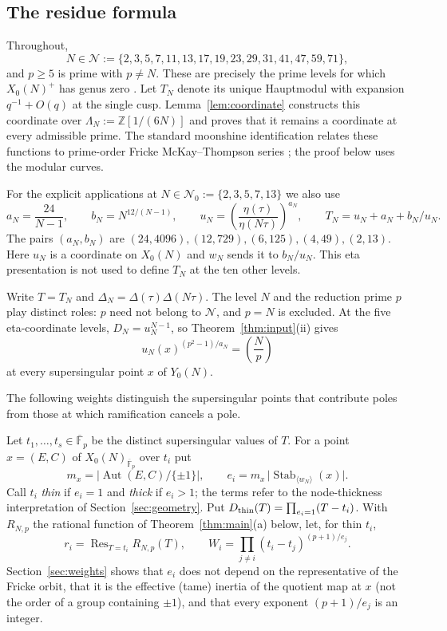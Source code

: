 \documentclass[11pt,a4paper]{article}
\numberwithin{equation}{section}
\theoremstyle{definition}
\theoremstyle{remark}
\newcommand{\Fb}{\overline{\mathbb F}_p}
\newcommand{\Z}{\mathbb Z}
\newcommand{\Res}{\operatorname{Res}}
\newcommand{\Aut}{\operatorname{Aut}}
\newcommand{\Stab}{\operatorname{Stab}}
\newcommand{\Lp}[1]{\left(\frac{#1}{p}\right)}
\begin{document}
\subsection{The residue formula}
Throughout,
\[
N\in\mathcal N:=\{2,3,5,7,11,13,17,19,23,29,31,41,47,59,71\},
\]
and $p\ge5$ is prime with $p\ne N$.
These are precisely the prime levels for which $X_0(N)^+$ has genus
zero \citep[\S3, Corollary]{Ogg75}. Let $T_N$ denote its unique
Hauptmodul with expansion $q^{-1}+O(q)$ at the single cusp.
Lemma~\ref{lem:coordinate} constructs this coordinate over
$\Lambda_N:=\Z[1/(6N)]$ and proves that it remains a coordinate
at every admissible prime. The standard moonshine identification
relates these functions to prime-order Fricke McKay--Thompson series
\citep{CN79,CMT19}; the proof below uses the modular curves.

For the explicit applications at
$N\in\mathcal N_0:=\{2,3,5,7,13\}$ we also use
\[
a_N=\frac{24}{N-1},\qquad b_N=N^{12/(N-1)},\qquad
u_N=\left(\frac{\eta(\tau)}{\eta(N\tau)}\right)^{a_N},\qquad
T_N=u_N+a_N+b_N/u_N.
\]
The pairs $(a_N,b_N)$ are $(24,4096),(12,729),(6,125),(4,49),(2,13)$.
Here $u_N$ is a coordinate on $X_0(N)$ and $w_N$ sends it to $b_N/u_N$.
This eta presentation is not used to define $T_N$ at the ten other levels.

Write $T=T_N$ and
$\Delta_N=\Delta(\tau)\Delta(N\tau)$. The level $N$ and the
reduction prime $p$ play distinct roles: $p$ need not belong to
$\mathcal N$, and $p=N$ is excluded.
At the five eta-coordinate levels, $D_N=u_N^{N-1}$, so
Theorem~\ref{thm:input}(ii) gives
\[
u_N(x)^{(p^2-1)/a_N}=\Lp N
\]
at every supersingular point $x$ of $Y_0(N)$.

The following weights distinguish the supersingular points that
contribute poles from those at which ramification cancels a pole.

Let $t_1,\dots,t_s\in\Fb$ be the distinct supersingular values of $T$. For a point
$x=(E,C)$ of $X_0(N)_{\Fb}$ over $t_i$ put
\[
m_x=\bigl|\Aut(E,C)/\{\pm1\}\bigr|,\qquad e_i=m_x\,\bigl|\Stab_{\langle w_N\rangle}(x)\bigr|.
\]
Call $t_i$ \emph{thin} if $e_i=1$ and \emph{thick} if $e_i>1$; the terms refer to the
node-thickness interpretation of Section~\ref{sec:geometry}. Put
$D_{\rm thin}(T)=\prod_{e_i=1}(T-t_i)$. With $R_{N,p}$ the rational function of
Theorem~\ref{thm:main}(a) below, let, for thin $t_i$,
\[
r_i=\Res_{T=t_i}R_{N,p}(T),\qquad W_i=\prod_{j\ne i}(t_i-t_j)^{(p+1)/e_j}.
\]
Section~\ref{sec:weights} shows that $e_i$ does not depend on the representative of the Fricke
orbit, that it is the effective (tame) inertia of the quotient map at $x$ (not the order of a group
containing $\pm1$), and that every exponent $(p+1)/e_j$ is an integer.
\end{document}
